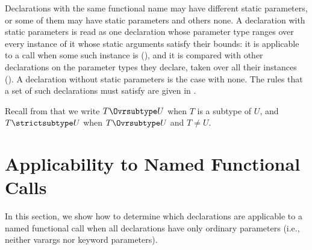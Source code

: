 Declarations with the same functional name may have different static
parameters, or some of them may have static parameters and others none.
A declaration with static parameters is read as one declaration whose
parameter type ranges over every instance of it whose static arguments
satisfy their bounds: it is applicable to a call when some such instance is
(), and it is compared with other
declarations on the parameter types they declare, taken over all their
instances ().
A declaration without static parameters is the case with none.
The rules that a set of such declarations must satisfy are given in
.



Recall from  that we write
$T \Ovrsubtype U$ when $T$ is a subtype of $U$,
and $T \strictsubtype U$ when $T \Ovrsubtype U$ and $T \neq U$.


\section{Applicability to Named Functional Calls}
In this section, we show how to determine which declarations are
applicable to a named functional call when all declarations have only
ordinary parameters (i.e., neither varargs nor keyword parameters).

